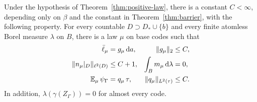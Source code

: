 \begin{lemma}\label{lem:countable-law}
Under the hypothesis of Theorem~\ref{thm:positive-law}, there is a constant
\(C<\infty\), depending only on \(\beta\) and the constant in
Theorem~\ref{thm:barrier}, with the following property.  For every countable
\(D\supset D_*\cup\{b\}\) and every finite atomless Borel measure
\(\lambda\) on \(B\), there is a law \(\mu\) on base codes such that
\begin{align}
 \bar\ell_\mu&=g_\mu\,\mathrm d a,
 &\|g_\mu\|_2&\le C,\label{eq:countable-law-occupation}\\
 \|n_\mu|_D\|_{\ell^2(D)}&\le C+1,
 &\int_Bm_\mu\,\mathrm d\lambda&=0,\label{eq:countable-law-dust}\\
 \operatorname{\mathbb E}_\mu\psi_\Gamma&=q_\mu\,\tau,
 &\|q_\mu\|_{L^2(\tau)}&\le C.\label{eq:countable-law-tuples}
\end{align}
In addition, \(\lambda(\gamma(Z_\Gamma))=0\) for almost every code.
\end{lemma}

